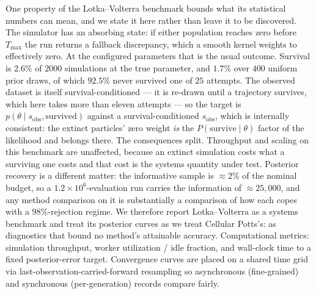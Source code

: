 One property of the Lotka--Volterra benchmark bounds what its statistical numbers can mean, and we state it here rather than leave it to be discovered. The simulator has an absorbing state: if either population reaches zero before $T_{\max}$ the run returns a fallback discrepancy, which a smooth kernel weights to effectively zero. At the configured parameters that is the usual outcome. Survival is $2.6\%$ of $2000$ simulations at the true parameter, and $1.7\%$ over $400$ uniform prior draws, of which $92.5\%$ never survived one of $25$ attempts. The observed dataset is itself survival-conditioned --- it is re-drawn until a trajectory survives, which here takes more than eleven attempts --- so the target is $p(\theta \mid s_{\mathrm{obs}}, \text{survived})$ against a survival-conditioned $s_{\mathrm{obs}}$, which is internally consistent: the extinct particles' zero weight \emph{is} the $P(\text{survive}\mid\theta)$ factor of the likelihood and belongs there. The consequences split. Throughput and scaling on this benchmark are unaffected, because an extinct simulation costs what a surviving one costs and that cost is the systems quantity under test. Posterior recovery is a different matter: the informative sample is ${\approx}2\%$ of the nominal budget, so a $1.2\times10^6$-evaluation run carries the information of ${\approx}25{,}000$, and any method comparison on it is substantially a comparison of how each copes with a $98\%$-rejection regime. We therefore report Lotka--Volterra as a systems benchmark and treat its posterior curves as we treat Cellular Potts's: as diagnostics that bound no method's attainable accuracy. Computational metrics: simulation throughput, worker utilization / idle fraction, and wall-clock time to a fixed posterior-error target. Convergence curves are placed on a shared time grid via last-observation-carried-forward resampling so asynchronous (fine-grained) and synchronous (per-generation) records compare fairly.
